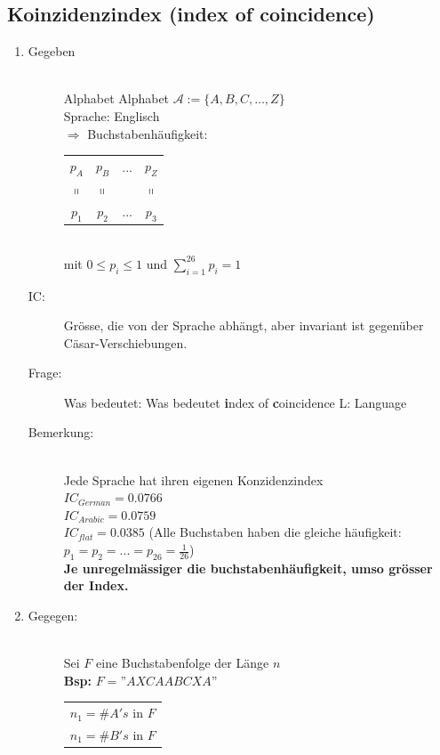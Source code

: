 \documentclass[10pt]{article}
\newcommand{\Pota}{\mathcal{A}}
\newcommand{\Bold}[1]{\textbf{#1}} %
\newcommand{\Ra}{\Rightarrow}
\newcommand{\Sumone}[2]{\sum_{#2=1}^{#1}} %
\begin{document}
\subsection{Koinzidenzindex (index of coincidence)}
\begin{enumerate}
  \item \begin{description}
	\item[Gegeben] \hfill \\
		Alphabet Alphabet $\Pota:=\{A,B,C,\dots,Z\}$\\
		Sprache: Englisch \\ 
		$\Ra$ Buchstabenhäufigkeit: 
		\begin{tabular}{c c c c}
			$p_A$ & $p_B$ & ... & $p_Z$ \\
			$\shortparallel$ & $\shortparallel$ & & $\shortparallel$ \\
			$p_1$ & $p_2$ & ... & $p_3$ \\
		\end{tabular} \\
		mit $0\leq p_i \leq 1$ und $\sum_{i=1}^{26} p_i=1$
	\item[IC:] Grösse, die von der Sprache abhängt, aber invariant ist gegenüber Cäsar-Verschiebungen.
	\item[Frage:] Was bedeutet: Was bedeutet \fbox{$IC_L:=\Sumone{26}{1}P_i^2$} \Bold{i}ndex of \Bold{c}oincidence L: Language
	\item[Bemerkung:] \hfill \\
		Jede Sprache hat ihren eigenen Konzidenzindex \\
		$IC_{German}=0.0766$ \\
		$IC_{Arabic}=0.0759$ \\
		$IC_{flat}=0.0385$ (Alle Buchstaben haben die gleiche häufigkeit: $p_1=p_2=...=p_{26}=\frac{1}{26}$)\\
		\textbf{Je unregelmässiger die buchstabenhäufigkeit, umso grösser der Index.}
	\end{description}
 \item  \begin{description}
	\item[Gegegen:] \hfill \\
		Sei $F$ eine Buchstabenfolge der Länge $n$\\
		\Bold{Bsp:} $F=$''$AXCAABCXA$''\\
		\begin{tabular}{l}
		  $n_1=\# A's$ in $F$\\
		  $n_1=\# B's$ in $F$\\

\end{tabular}
\end{description}
\end{enumerate}
\end{document}
